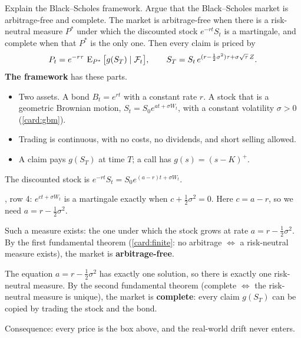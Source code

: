 \begin{problem}[Q4]
Explain the Black--Scholes framework. Argue that the Black--Scholes market is arbitrage-free and complete.
\cardsays The market is arbitrage-free when there is a risk-neutral measure $P^*$ under which the discounted stock $e^{-rt}S_t$ is a martingale, and complete when that $P^*$ is the only one. Then every claim is priced by
\[
P_t=e^{-r\tau}\,\operatorname{E}_{P^*}\big[g(S_T)\mid\mathcal F_t\big],\qquad S_T=S_t\,e^{(r-\frac12\sigma^2)\tau+\sigma\sqrt\tau\,Z}.
\]
\textbf{The framework} has these parts.
\begin{itemize}
\item Two assets. A bond $B_t=e^{rt}$ with a constant rate $r$. A stock that is a geometric Brownian motion, $S_t=S_0e^{at+\sigma W_t}$, with a constant volatility $\sigma>0$ (\cref{card:gbm}).
\item Trading is continuous, with no costs, no dividends, and short selling allowed.
\item A claim pays $g(S_T)$ at time $T$; a call has $g(s)=(s-K)^+$.
\end{itemize}
\working
\begin{steps}
\item The discounted stock is $e^{-rt}S_t=S_0e^{(a-r)t+\sigma W_t}$.
\item {}, row 4: $e^{ct+\sigma W_t}$ is a martingale exactly when $c+\frac12\sigma^2=0$. Here $c=a-r$, so we need $a=r-\frac12\sigma^2$.
\item Such a measure exists: the one under which the stock grows at rate $a=r-\frac12\sigma^2$. By the first fundamental theorem (\cref{card:finite}: no arbitrage $\iff$ a risk-neutral measure exists), the market is \textbf{arbitrage-free}.
\item The equation $a=r-\frac12\sigma^2$ has exactly one solution, so there is exactly one risk-neutral measure. By the second fundamental theorem (complete $\iff$ the risk-neutral measure is unique), the market is \textbf{complete}: every claim $g(S_T)$ can be copied by trading the stock and the bond.
\item Consequence: every price is the box above, and the real-world drift never enters.
\end{steps}
\end{problem}

